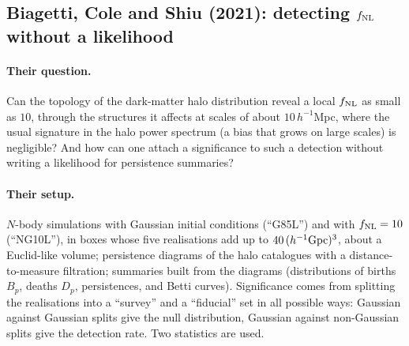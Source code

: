 \subsection{Biagetti, Cole and Shiu (2021): detecting $f_{\rm NL}$ without a likelihood}
\label{12c:sec:repro-bcs}

\paragraph{Their question.} Can the topology of the dark-matter halo distribution reveal a local $f_{\rm NL}$ as small as $10$, through the
structures it affects at scales of about $10\,h^{-1}$Mpc, where the usual signature in the halo power spectrum (a bias that grows on large scales)
is negligible? And how can one attach a significance to such a detection without writing a likelihood for persistence summaries?

\paragraph{Their setup.} $N$-body simulations with Gaussian initial conditions (``G85L'') and with $f_{\rm NL}=10$ (``NG10L''), in boxes whose five
realisations add up to $40\,(h^{-1}{\rm Gpc})^3$, about a Euclid-like volume; persistence diagrams of the halo catalogues with a distance-to-measure
filtration; summaries built from the diagrams (distributions of births $B_p$, deaths $D_p$, persistences, and Betti curves). Significance comes
from splitting the realisations into a ``survey'' and a ``fiducial'' set in all possible ways: Gaussian against Gaussian splits give the null
distribution, Gaussian against non-Gaussian splits give the detection rate. Two statistics are used.

